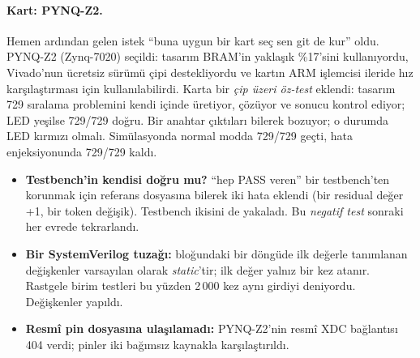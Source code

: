 \paragraph{Kart: PYNQ-Z2.} Hemen ardından gelen istek “buna uygun bir kart seç sen git de kur” oldu. PYNQ-Z2 (Zynq-7020) seçildi: tasarım BRAM'in yaklaşık \%17'sini kullanıyordu, Vivado'nun ücretsiz sürümü çipi destekliyordu ve kartın ARM işlemcisi ileride hız karşılaştırması için kullanılabilirdi. Karta bir \emph{çip üzeri öz-test} eklendi: tasarım 729 sıralama problemini kendi içinde üretiyor, çözüyor ve sonucu kontrol ediyor; LED yeşilse 729/729 doğru. Bir anahtar çıktıları bilerek bozuyor; o durumda LED kırmızı olmalı. Simülasyonda normal modda 729/729 geçti, hata enjeksiyonunda 729/729 kaldı.

\sorunlar
\begin{itemize}
  \item \textbf{Testbench'in kendisi doğru mu?} “hep PASS veren” bir testbench'ten korunmak için referans dosyasına bilerek iki hata eklendi (bir residual değer +1, bir token değişik). Testbench ikisini de yakaladı. Bu \emph{negatif test} sonraki her evrede tekrarlandı.
  \item \textbf{Bir SystemVerilog tuzağı:}  bloğundaki bir döngüde ilk değerle tanımlanan değişkenler varsayılan olarak \emph{static}'tir; ilk değer yalnız bir kez atanır. Rastgele birim testleri bu yüzden 2\,000 kez aynı girdiyi deniyordu. Değişkenler  yapıldı.
  \item \textbf{Resmî pin dosyasına ulaşılamadı:} PYNQ-Z2'nin resmî XDC bağlantısı 404 verdi; pinler iki bağımsız kaynakla karşılaştırıldı.
\end{itemize}

